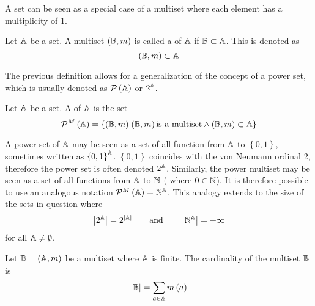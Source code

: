 \begin{remark}
	A set can be seen as a special case of a multiset where each element has a multiplicity of 1.
\end{remark}

\begin{define}
	Let \( \mathbb{A} \) be a set. A multiset \( \left( \mathbb{B}, m \right) \) is called a  of \( \mathbb{A} \) if \( \mathbb{B} \subset \mathbb{A} \). This is denoted as
	\[ \left( \mathbb{B}, m \right) \subset \mathbb{A} \]
\end{define}

The previous definition allows for a generalization of the concept of a power set, which is usually denoted as \( \mathcal{P} \left( \mathbb{A} \right) \) or \( 2^{\mathbb{A}} \).

\begin{define}
	Let \( \mathbb{A} \) be a set. A  of \( \mathbb{A} \) is the set
	\[ \mathcal{P}^M \left( \mathbb{A} \right) = \left\{ \left( \mathbb{B}, m \right) \middle| \left( \mathbb{B}, m \right) \text{is a multiset} \wedge \left( \mathbb{B}, m \right) \subset \mathbb{A} \right\} \]
\end{define}

\begin{remark}
	A power set of \( \mathbb{A} \) may be seen as a set of all function from \( \mathbb{A} \) to \( \left\{ 0, 1 \right\} \), sometimes written as \( \left\{ 0, 1 \right\}^{\mathbb{A}} \). \( \left\{ 0, 1 \right\} \) coincides with the von Neumann ordinal 2, therefore the power set is often denoted \( 2^{\mathbb{A}} \). Similarly, the power multiset may be seen as a set of all functions from \( \mathbb{A} \) to \( \mathbb{N} \) ( where \( 0 \in \mathbb{N} \)). It is therefore possible to use an analogous notation \( \mathcal{P}^M \left( \VUset{A} \right) = \VUfield{N}^\VUset{A} \). This analogy extends to the size of the sets in question where
	\[ \left\lvert 2^{\VUset{A}} \right\rvert = 2^{\left\lvert \VUset{A} \right\rvert} \qquad \text{and} \qquad \left\lvert \VUfield{N}^\VUset{A} \right\rvert = + \infty \]
	for all \( \mathbb{A} \neq \emptyset \).
\end{remark}

\begin{define}
	Let \( \mathbb{B} = \left( \mathbb{A}, m \right) \) be a multiset where \( \mathbb{A} \) is finite. The cardinality of the multiset \( \mathbb{B} \) is
	\[ \left\lvert \mathbb{B} \right\rvert = \sum_{a \in \mathbb{A}} m \left( a \right) \]
\end{define}

